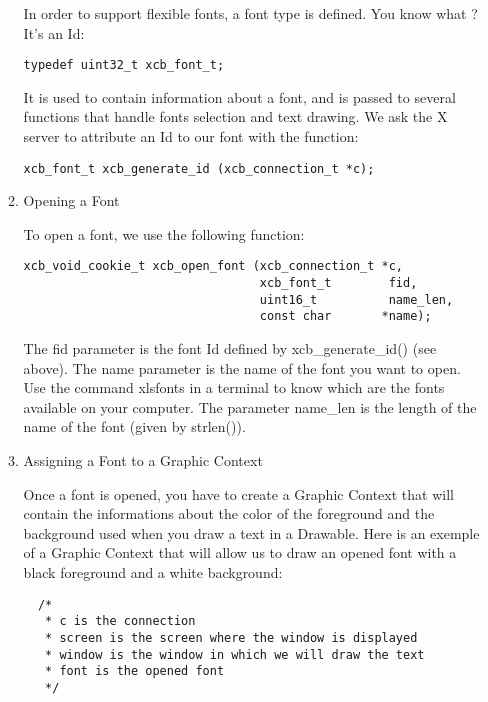 \documentclass[12pt,oneside,titlepage]{book}
\begin{document}
\begin{enumerate}
\begin{enumerate}
    In order to support flexible fonts, a font type is defined. You know
    what ? It's an Id:

\begin{verbatim}
typedef uint32_t xcb_font_t;
\end{verbatim}

    It is used to contain information about a font, and is passed to
    several functions that handle fonts selection and text drawing. We
    ask the X server to attribute an Id to our font with the function:

\begin{verbatim}
xcb_font_t xcb_generate_id (xcb_connection_t *c);
\end{verbatim}

    \hfill\break
  \item
    \protect\hypertarget{openingfont}{}{Opening a Font}

    To open a font, we use the following function:

\begin{verbatim}
xcb_void_cookie_t xcb_open_font (xcb_connection_t *c,
                                 xcb_font_t        fid,
                                 uint16_t          name_len,
                                 const char       *name);
\end{verbatim}

    The {fid} parameter is the font Id defined by {xcb\_generate\_id()}
    (see above). The {name} parameter is the name of the font you want
    to open. Use the command {xlsfonts} in a terminal to know which are
    the fonts available on your computer. The parameter {name\_len} is
    the length of the name of the font (given by {strlen()}).
  \item
    \protect\hypertarget{assigningfont}{}{Assigning a Font to a Graphic
    Context}

    Once a font is opened, you have to create a Graphic Context that
    will contain the informations about the color of the foreground and
    the background used when you draw a text in a Drawable. Here is an
    exemple of a Graphic Context that will allow us to draw an opened
    font with a black foreground and a white background:

\begin{verbatim}
  /*
   * c is the connection
   * screen is the screen where the window is displayed
   * window is the window in which we will draw the text
   * font is the opened font
   */


\end{verbatim}
\end{enumerate}
\end{enumerate}
\end{document}
